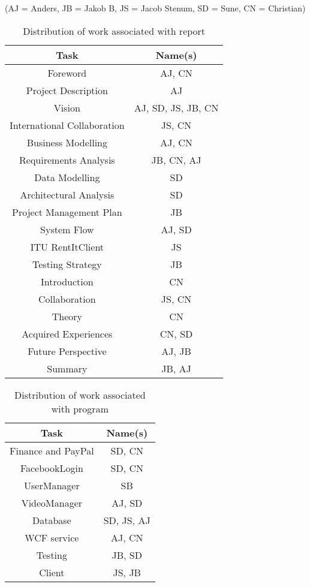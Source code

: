 \label{Distribution of Work}
(AJ = Anders, JB = Jakob B, JS = Jacob Stenum, SD = Sune, CN = Christian)\\
\begin{table}[H]
\caption{Distribution of work associated with report}
\centering

\begin{tabular}{c c}
Task & Name(s) \\ [1.5ex] 
\hline
Foreword & AJ, CN \\
Project Description & AJ \\
Vision & AJ, SD, JS, JB, CN\\
International Collaboration & JS, CN \\
Business Modelling & AJ, CN \\
Requirements Analysis & JB, CN, AJ\\
Data Modelling & SD \\
Architectural Analysis & SD \\
Project Management Plan & JB \\
System Flow & AJ, SD\\
ITU RentItClient & JS \\ 
Testing Strategy & JB\\
Introduction & CN\\
Collaboration & JS, CN \\
Theory & CN \\
Acquired Experiences & CN, SD\\
Future Perspective & AJ, JB \\
Summary & JB, AJ \\

\end{tabular}
\end{table}
\newpage
\begin{table}[H]
\caption{Distribution of work associated with program}
\centering
\begin{tabular}{c c}
Task & Name(s)\\ [1.5ex] 
\hline
Finance and PayPal & SD, CN \\
FacebookLogin & SD, CN \\
UserManager & SB \\
VideoManager & AJ, SD \\
Database & SD, JS, AJ \\
WCF service & AJ, CN\\
Testing & JB, SD \\
Client & JS, JB\\


\end{tabular}
\end{table}

